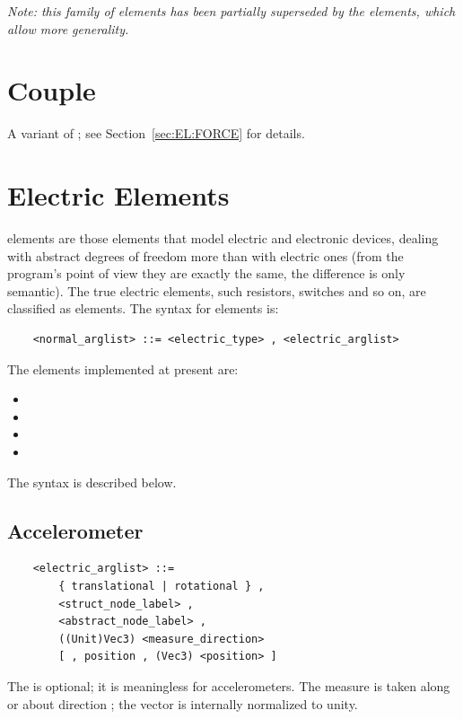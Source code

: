 {\em Note: this family of elements has been partially superseded by the
 elements, which allow more generality.}




\section{Couple}
A variant of ; see Section~\ref{sec:EL:FORCE} for details.




\section{Electric Elements}
 elements are those elements that model electric and electronic
devices, dealing with abstract degrees of freedom more than with electric
ones (from the program's point of view they are exactly the same, the
difference is only semantic). The true electric elements, such resistors,
switches and so on, are classified as  elements.
The syntax for  elements is:
\begin{verbatim}
    <normal_arglist> ::= <electric_type> , <electric_arglist>
\end{verbatim}
The  elements implemented at present are:
\begin{itemize}
	\item {}
	\item {}
	\item {}
	\item {}
\end{itemize}
The syntax is described below.

\subsection{Accelerometer}
\begin{verbatim}
    <electric_arglist> ::=
        { translational | rotational } ,
        <struct_node_label> ,
        <abstract_node_label> ,
        ((Unit)Vec3) <measure_direction>
        [ , position , (Vec3) <position> ]
\end{verbatim}
The  is optional; it is meaningless for 
accelerometers.
The measure is taken along or about direction ;
the vector is internally normalized to unity.

